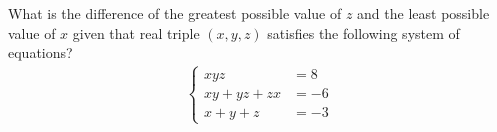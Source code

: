 What is the difference of the greatest possible value of $z$ and the least possible value of $x$ given that real triple $(x,y,z)$ satisfies the following system of equations?
\begin{align*}
\left\{\begin{aligned}
xyz & = 8
\\
xy +yz + zx & = -6
\\
x + y + z & = -3
\end{aligned}\right.
\end{align*}
